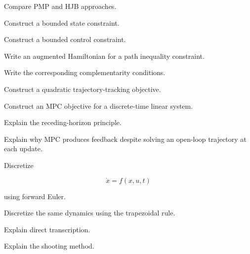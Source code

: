 \begin{exercise}[3]
Compare PMP and HJB approaches.
\end{exercise}

\begin{exercise}[3]
Construct a bounded state constraint.
\end{exercise}

\begin{exercise}[3]
Construct a bounded control constraint.
\end{exercise}

\begin{exercise}[3]
Write an augmented Hamiltonian for a path inequality constraint.
\end{exercise}

\begin{exercise}[3]
Write the corresponding complementarity conditions.
\end{exercise}

\begin{exercise}[3]
Construct a quadratic trajectory-tracking objective.
\end{exercise}

\begin{exercise}[3]
Construct an MPC objective for a discrete-time linear system.
\end{exercise}

\begin{exercise}[3]
Explain the receding-horizon principle.
\end{exercise}

\begin{exercise}[3]
Explain why MPC produces feedback despite solving an open-loop trajectory
at each update.
\end{exercise}

\begin{exercise}[3]
Discretize

\[
\dot{x}=f(x,u,t)
\]

using forward Euler.
\end{exercise}

\begin{exercise}[3]
Discretize the same dynamics using the trapezoidal rule.
\end{exercise}

\begin{exercise}[3]
Explain direct transcription.
\end{exercise}

\begin{exercise}[3]
Explain the shooting method.
\end{exercise}

